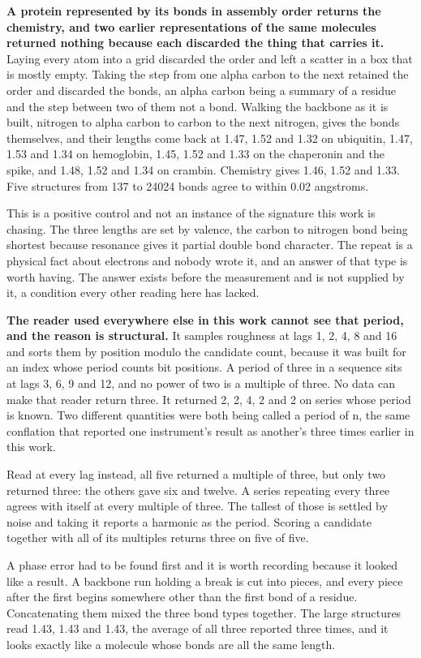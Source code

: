 \textbf{A protein represented by its bonds in assembly order returns the chemistry, and two earlier representations of the same molecules returned nothing because each discarded the thing that carries it.} Laying every atom into a grid discarded the order and left a scatter in a box that is mostly empty. Taking the step from one alpha carbon to the next retained the order and discarded the bonds, an alpha carbon being a summary of a residue and the step between two of them not a bond. Walking the backbone as it is built, nitrogen to alpha carbon to carbon to the next nitrogen, gives the bonds themselves, and their lengths come back at 1.47, 1.52 and 1.32 on ubiquitin, 1.47, 1.53 and 1.34 on hemoglobin, 1.45, 1.52 and 1.33 on the chaperonin and the spike, and 1.48, 1.52 and 1.34 on crambin. Chemistry gives 1.46, 1.52 and 1.33. Five structures from 137 to 24024 bonds agree to within 0.02 angstroms.

This is a positive control and not an instance of the signature this work is chasing. The three lengths are set by valence, the carbon to nitrogen bond being shortest because resonance gives it partial double bond character. The repeat is a physical fact about electrons and nobody wrote it, and an answer of that type is worth having. The answer exists before the measurement and is not supplied by it, a condition every other reading here has lacked.

\textbf{The reader used everywhere else in this work cannot see that period, and the reason is structural.} It samples roughness at lags 1, 2, 4, 8 and 16 and sorts them by position modulo the candidate count, because it was built for an index whose period counts bit positions. A period of three in a sequence sits at lags 3, 6, 9 and 12, and no power of two is a multiple of three. No data can make that reader return three. It returned 2, 2, 4, 2 and 2 on series whose period is known. Two different quantities were both being called a period of n, the same conflation that reported one instrument's result as another's three times earlier in this work.

Read at every lag instead, all five returned a multiple of three, but only two returned three: the others gave six and twelve. A series repeating every three agrees with itself at every multiple of three. The tallest of those is settled by noise and taking it reports a harmonic as the period. Scoring a candidate together with all of its multiples returns three on five of five.

A phase error had to be found first and it is worth recording because it looked like a result. A backbone run holding a break is cut into pieces, and every piece after the first begins somewhere other than the first bond of a residue. Concatenating them mixed the three bond types together. The large structures read 1.43, 1.43 and 1.43, the average of all three reported three times, and it looks exactly like a molecule whose bonds are all the same length.


